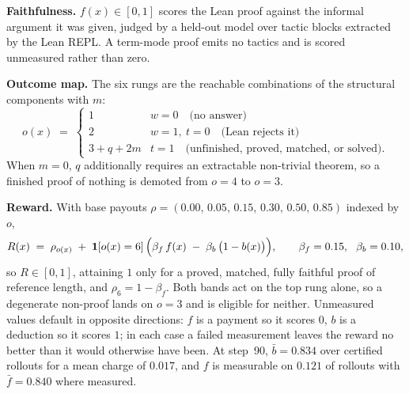 \textbf{Faithfulness.} $f(x)\in[0,1]$ scores the Lean proof against the informal
argument it was given, judged by a held-out model over tactic blocks extracted
by the Lean REPL. A term-mode proof emits no tactics and is scored unmeasured
rather than zero.

\textbf{Outcome map.} The six rungs are the reachable combinations of the
structural components with $m$:
%
\begin{equation}
\label{eq:outcome}
o(x) \;=\;
\begin{cases}
1 & w=0 \quad \text{(no answer)}\\
2 & w=1,\ t=0 \quad \text{(Lean rejects it)}\\
3 + q + 2m & t=1 \quad \text{(unfinished, proved, matched, or solved)} .
\end{cases}
\end{equation}
%
When $m=0$, $q$ additionally requires an extractable non-trivial theorem, so a
finished proof of nothing is demoted from $o=4$ to $o=3$.

\textbf{Reward.} With base payouts
$\rho = (0.00,\, 0.05,\, 0.15,\, 0.30,\, 0.50,\, 0.85)$ indexed by $o$,
%
\begin{equation}
\label{eq:reward}
R(x) \;=\; \rho_{o(x)} \;+\; \mathbf{1}\!\left[o(x)=6\right]\Bigl(\beta_f\, f(x) \;-\; \beta_b\,\bigl(1-b(x)\bigr)\Bigr),
\qquad \beta_f = 0.15,\ \ \beta_b = 0.10 ,
\end{equation}
%
so $R\in[0,1]$, attaining $1$ only for a proved, matched, fully faithful proof
of reference length, and $\rho_6 = 1 - \beta_f$. Both bands act on the top rung
alone, so a degenerate non-proof lands on $o=3$ and is eligible for neither.
Unmeasured values default in opposite directions: $f$ is a payment so it scores
$0$, $b$ is a deduction so it scores $1$; in each case a failed measurement
leaves the reward no better than it would otherwise have been. At step~90,
$\bar{b}=0.834$ over certified rollouts for a mean charge of $0.017$, and $f$ is
measurable on $0.121$ of rollouts with $\bar{f}=0.840$ where measured.
